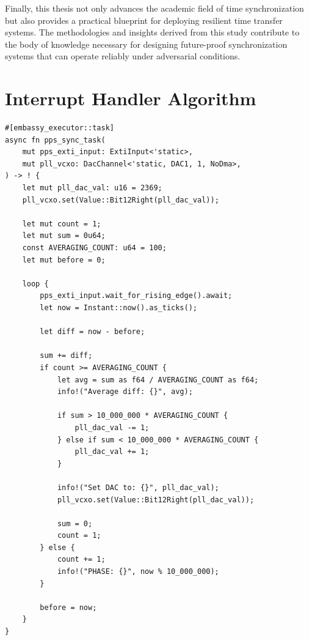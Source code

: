\documentclass[12pt, a4paper]{extarticle}
\begin{document}
Finally, this thesis not only advances the academic field of time
synchronization but also provides a practical blueprint for deploying resilient
time transfer systems. The methodologies and insights derived from this study
contribute to the body of knowledge necessary for designing future-proof
synchronization systems that can operate reliably under adversarial conditions.

\pagebreak

\printbibliography[heading=bibintoc]

\pagebreak
\appendix

\section{Interrupt Handler Algorithm} \label{appendix:interrupt-algo}

\begin{verbatim}
#[embassy_executor::task]
async fn pps_sync_task(
    mut pps_exti_input: ExtiInput<'static>,
    mut pll_vcxo: DacChannel<'static, DAC1, 1, NoDma>,
) -> ! {
    let mut pll_dac_val: u16 = 2369;
    pll_vcxo.set(Value::Bit12Right(pll_dac_val));

    let mut count = 1;
    let mut sum = 0u64;
    const AVERAGING_COUNT: u64 = 100;
    let mut before = 0;

    loop {
        pps_exti_input.wait_for_rising_edge().await;
        let now = Instant::now().as_ticks();

        let diff = now - before;

        sum += diff;
        if count >= AVERAGING_COUNT {
            let avg = sum as f64 / AVERAGING_COUNT as f64;
            info!("Average diff: {}", avg);

            if sum > 10_000_000 * AVERAGING_COUNT {
                pll_dac_val -= 1;
            } else if sum < 10_000_000 * AVERAGING_COUNT {
                pll_dac_val += 1;
            }

            info!("Set DAC to: {}", pll_dac_val);
            pll_vcxo.set(Value::Bit12Right(pll_dac_val));

            sum = 0;
            count = 1;
        } else {
            count += 1;
            info!("PHASE: {}", now % 10_000_000);
        }

        before = now;
    }
}
\end{verbatim}
\end{document}
